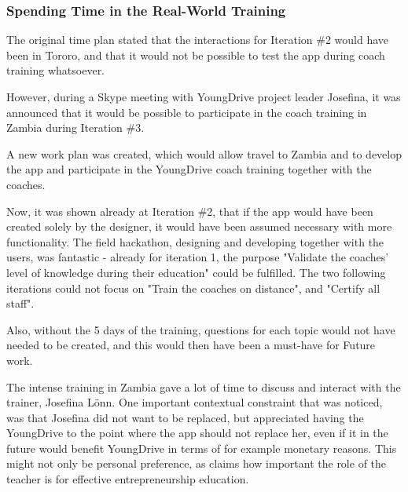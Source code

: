   \subsubsection{Spending Time in the Real-World Training}
  The original time plan stated that the interactions for Iteration \#2 would have been in Tororo, and that it would not be possible to test the app during coach training whatsoever.


  However, during a Skype meeting with YoungDrive project leader Josefina, it was announced that it would be possible to participate in the coach training in Zambia during Iteration \#3.

  A new work plan was created, which would allow travel to Zambia and to develop the app and participate in the YoungDrive coach training together with the coaches.

  Now, it was shown already at Iteration \#2, that if the app would have been created solely by the designer, it would have been assumed necessary with more functionality. The field hackathon, designing and developing together with the users, was fantastic - already for iteration 1, the purpose "Validate the coaches' level of knowledge during their education" could be fulfilled. The two following iterations could not focus on "Train the coaches on distance", and "Certify all staff".

  Also, without the 5 days of the training, questions for each topic would not have needed to be created, and this would then have been a must-have for Future work. %

  The intense training in Zambia gave a lot of time to discuss and interact with the trainer, Josefina Lönn. One important contextual constraint that was noticed, was that Josefina did not want to be replaced, but appreciated having the YoungDrive to the point where the app should not replace her, even if it in the future would benefit YoungDrive in terms of for example monetary reasons. This might not only be personal preference, as \cite{ruskovaara} claims how important the role of the teacher is for effective entrepreneurship education.

